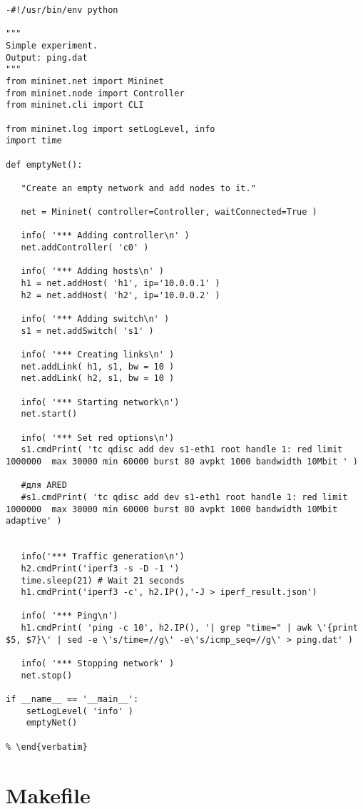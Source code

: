 \begin{verbatim}
-#!/usr/bin/env python

"""
Simple experiment.
Output: ping.dat
"""
from mininet.net import Mininet
from mininet.node import Controller
from mininet.cli import CLI

from mininet.log import setLogLevel, info
import time

def emptyNet():

   "Create an empty network and add nodes to it."

   net = Mininet( controller=Controller, waitConnected=True )

   info( '*** Adding controller\n' )
   net.addController( 'c0' )

   info( '*** Adding hosts\n' )
   h1 = net.addHost( 'h1', ip='10.0.0.1' )
   h2 = net.addHost( 'h2', ip='10.0.0.2' )

   info( '*** Adding switch\n' )
   s1 = net.addSwitch( 's1' )

   info( '*** Creating links\n' )
   net.addLink( h1, s1, bw = 10 )
   net.addLink( h2, s1, bw = 10 )

   info( '*** Starting network\n')
   net.start()

   info( '*** Set red options\n')
   s1.cmdPrint( 'tc qdisc add dev s1-eth1 root handle 1: red limit 1000000  max 30000 min 60000 burst 80 avpkt 1000 bandwidth 10Mbit ' )
   
   #для ARED
   #s1.cmdPrint( 'tc qdisc add dev s1-eth1 root handle 1: red limit 1000000  max 30000 min 60000 burst 80 avpkt 1000 bandwidth 10Mbit adaptive' )	


   info('*** Traffic generation\n')
   h2.cmdPrint('iperf3 -s -D -1 ')
   time.sleep(21) # Wait 21 seconds
   h1.cmdPrint('iperf3 -c', h2.IP(),'-J > iperf_result.json')

   info( '*** Ping\n')
   h1.cmdPrint( 'ping -c 10', h2.IP(), '| grep "time=" | awk \'{print $5, $7}\' | sed -e \'s/time=//g\' -e\'s/icmp_seq=//g\' > ping.dat' )

   info( '*** Stopping network' )
   net.stop()

if __name__ == '__main__':
    setLogLevel( 'info' )
    emptyNet()
    
% \end{verbatim}
\end{verbatim}


\section*{Makefile}

